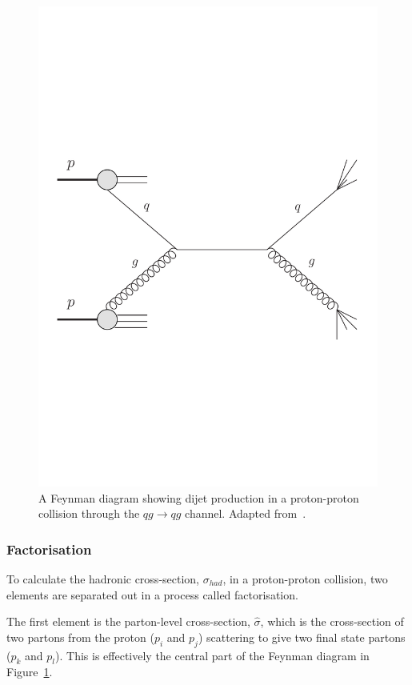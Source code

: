 \begin{figure}[!hbt]
  \begin{center}
    \includegraphics[width=0.7\linewidth, angle=0]{figs/Theory/qcd_dijet_feynman.pdf}
  \end{center}
  \caption[A Feynman diagram showing dijet production in a proton-proton collision through the $qg \to qg$ channel.]
          {A Feynman diagram showing dijet production in a proton-proton collision through the $qg \to qg$ channel. Adapted from~\cite{theo-qcd_dijet_feynman}.}
  \label{fig:theo-qcd_dijet_feynman}
\end{figure}

\subsubsection{Factorisation}

To calculate the hadronic cross-section, $\sigma_{had}$, in a proton-proton collision,
two elements are separated out in a process called factorisation.

The first element is the parton-level cross-section, $\hat{\sigma}$, which is the cross-section of
two partons from the proton ($p_i$ and $p_j$) scattering to give two final state partons ($p_k$ and $p_l$).
This is effectively the central part of the Feynman diagram in Figure~\ref{fig:theo-qcd_dijet_feynman}.

